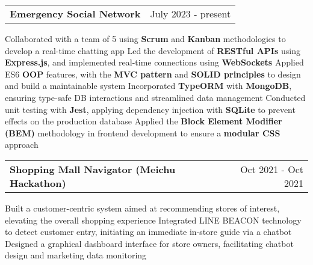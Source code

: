 \newcommand{\resumeProjEntry}[2]{
    \vspace{5pt}\item
      \begin{tabular*}{0.97\textwidth}{l@{\extracolsep{\fill}}r}
        \textbf{#1} & \small #2\\
      \end{tabular*}\vspace{-5pt}
}

\resumeProjEntry
{Emergency Social Network}
{July 2023 - present}
{
    \resumeItemListStart
        \resumeItem
        {Collaborated with a team of 5 using \textbf{Scrum} and \textbf{Kanban} methodologies to develop a real-time chatting app}
        \resumeItem
        {Led the development of \textbf{RESTful APIs} using \textbf{Express.js}, and implemented real-time connections using \textbf{WebSockets}}
        \resumeItem
        {Applied ES6 \textbf{OOP} features, with the \textbf{MVC pattern} and \textbf{SOLID principles} to design and build a maintainable system}
        \resumeItem
        {Incorporated \textbf{TypeORM} with \textbf{MongoDB}, ensuring type-safe DB interactions and streamlined data management}
        \resumeItem
        {Conducted unit testing with \textbf{Jest}, applying dependency injection with \textbf{SQLite} to prevent effects on the production database}
        \resumeItem
        {Applied the \textbf{Block Element Modifier (BEM)} methodology in frontend development to ensure a \textbf{modular CSS} approach}
    \resumeItemListEnd
}

\resumeProjEntry
{Shopping Mall Navigator (Meichu Hackathon)}
{Oct 2021 - Oct 2021}
{
    \resumeItemListStart
        \resumeItem
        {Built a customer-centric system aimed at recommending stores of interest, elevating the overall shopping experience}
        \resumeItem
        {Integrated LINE BEACON technology to detect customer entry, initiating an immediate in-store guide via a chatbot}
        \resumeItem
        {Designed a graphical dashboard interface for store owners, facilitating chatbot design and marketing data monitoring}
    \resumeItemListEnd
}


